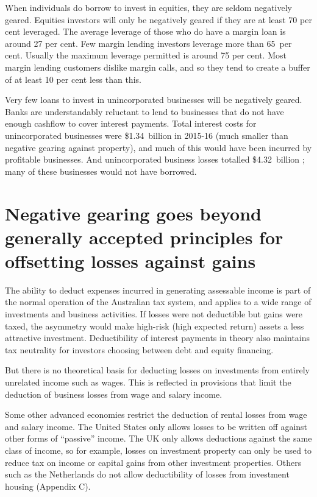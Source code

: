\documentclass{grattan}\usepackage[]{graphicx}\usepackage[]{color}
\begin{document}
When individuals do borrow to invest in equities, they are seldom negatively geared. Equities investors will only be negatively geared if they are at least 70 per cent leveraged.  The average leverage of those who do have a margin loan is around 27 per cent.  Few margin lending investors leverage more than 65~per cent. Usually the maximum leverage permitted is around 75 per cent. Most margin lending customers dislike margin calls, and so they tend to create a buffer of at least 10 per cent less than this. 





Very few loans to invest in unincorporated businesses will be negatively geared. Banks are understandably reluctant to lend to businesses that do not have enough cashflow to cover interest payments. Total interest costs for unincorporated businesses were \$1.34~billion in 2015-16  (much smaller than negative gearing against property), and much of this would have been incurred by profitable businesses. And unincorporated business losses totalled \$4.32~billion ; many of these businesses would not have borrowed. 

\section{Negative gearing goes beyond generally accepted principles for offsetting losses against gains}
The ability to deduct expenses incurred in generating assessable income is part of the normal operation of the Australian tax system, and applies to a wide range of investments and business activities. If losses were not deductible but gains were taxed, the asymmetry would make high-risk (high expected return) assets a less attractive investment. Deductibility of interest payments in theory also maintains tax neutrality for investors choosing between debt and equity financing.  

But there is no theoretical basis for deducting losses on investments from entirely unrelated income such as wages. This is reflected in provisions that limit the deduction of business losses from wage and salary income. 

Some other advanced economies restrict the deduction of rental losses from wage and salary income. The United States only allows losses to be written off against other forms of ``passive'' income.  The UK only allows deductions against the same class of income, so for example, losses on investment property can only be used to reduce tax on income or capital gains from other investment properties. Others such as the Netherlands do not allow deductibility of losses from investment housing (Appendix C). 
\end{document}
